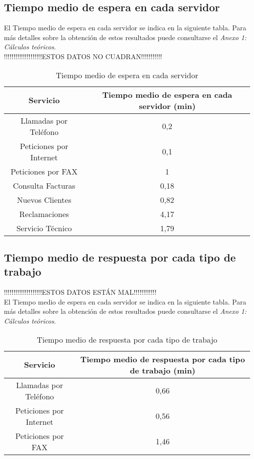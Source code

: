 \subsection{Tiempo medio de espera en cada servidor}
El Tiempo medio de espera en cada servidor se indica en la siguiente tabla. Para más detalles sobre la obtención de estos resultados puede consultarse el \textit{Anexo 1: Cálculos teóricos}.\\
!!!!!!!!!!!!!!!!!!!!ESTOS DATOS NO CUADRAN!!!!!!!!!!!\\
\begin{table}[H]
  \begin{center}
  \begin{tabular}{|c|c|}
    \hline
    \textbf{Servicio}       & \textbf{Tiempo medio de espera en cada servidor (min)} \\ \hline
    Llamadas por Teléfono   & 0,2                   \\ \hline
    Peticiones por Internet & 0,1                  \\ \hline
    Peticiones por FAX      & 1                   \\ \hline
    Consulta Facturas      & 0,18                   \\ \hline
    Nuevos Clientes      & 0,82                   \\ \hline
    Reclamaciones      & 4,17                   \\ \hline
    Servicio Técnico      & 1,79                   \\ \hline
  \end{tabular}
\end{center}
  \caption{Tiempo medio de espera en cada servidor}
  \end{table}
\subsection{Tiempo medio de respuesta por cada tipo de trabajo}
!!!!!!!!!!!!!!!!!!!!ESTOS DATOS ESTÁN MAL!!!!!!!!!!!!\\
El Tiempo medio de espera en cada servidor se indica en la siguiente tabla. Para más detalles sobre la obtención de estos resultados puede consultarse el \textit{Anexo 1: Cálculos teóricos}.\\

\begin{table}[H]
  \begin{center}
  \begin{tabular}{|c|c|}
    \hline
    \textbf{Servicio}       & \textbf{Tiempo medio de respuesta por cada tipo de trabajo (min)} \\ \hline
    Llamadas por Teléfono   & 0,66                   \\ \hline
    Peticiones por Internet & 0,56                  \\ \hline
    Peticiones por FAX      & 1,46                   \\ \hline
  \end{tabular}
\end{center}
  \caption{Tiempo medio de respuesta por cada tipo de trabajo}
  \end{table}
  
